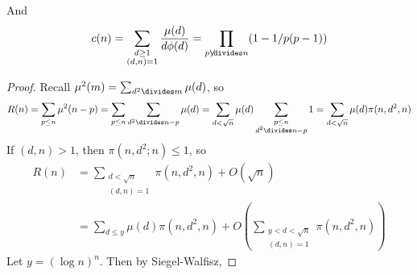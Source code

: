 And
%
\[ c(n) = \sum_{\substack{d \geq 1\\(d,n) = 1}} \frac{\mu(d)}{d \phi(d)} = \prod_{p \not \divides n} (1 - 1/p(p-1)) \]
%
\begin{proof}
    Recall $\mu^2(m) = \sum_{d^2 \divides m} \mu(d)$, so
    \[ R(n) = \sum_{p \leq n} \mu^2(n-p) = \sum_{p \leq n} \sum_{d^2 \divides n - p} \mu(d) = \sum_{d < \sqrt{n}} \mu(d) \sum_{\substack{p \leq n\\d^2 \divides n - p}} 1 = \sum_{d < \sqrt{n}} \mu(d) \pi(n,d^2,n) \]
    If $(d,n) > 1$, then $\pi(n,d^2;n) \leq 1$, so
    \begin{align*}
        R(n) &= \sum_{\substack{d < \sqrt{n}\\(d,n) = 1}} \pi(n,d^2,n) + O(\sqrt{n})\\
        &= \sum_{d \leq y} \mu(d) \pi(n,d^2,n) + O \left( \sum_{\substack{y < d < \sqrt{n}\\(d,n) = 1}} \pi(n,d^2,n) \right)
    \end{align*}
    Let $y = (\log n)^n$. Then by Siegel-Walfisz,
\end{proof}

